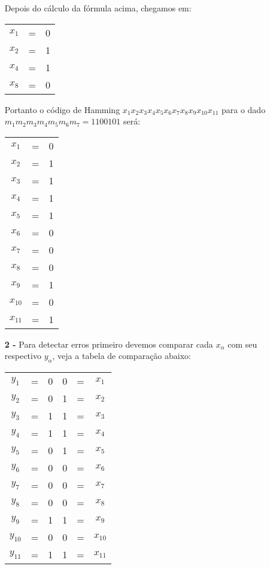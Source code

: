 \documentclass[12pt]{article}
\begin{document}
\begin{itemize}
			Depois do cálculo da fórmula acima, chegamos em:
			\begin{center}
				\begin{tabular}{ccl}
					$x_1$ & = & 0\\
					$x_2$ & = & 1\\
					$x_4$ & = & 1\\
					$x_8$ & = & 0\\
				\end{tabular}
			\end{center}
			Portanto o código de Hamming $x_1x_2x_3x_4x_5x_6x_7x_8x_9x_{10}x_{11}$ para 
			o dado $m_1m_2m_3m_4m_5m_6m_7 = 1100101$ será:
			\begin{center}
				\begin{tabular}{ccc}
					$x_1$ & = & 0\\
					$x_2$ & = & 1\\
					$x_3$ & = & 1 \\
					$x_4$ & = & 1\\
					$x_5$ & = & 1\\
					$x_6$ & = & 0\\
					$x_7$ & = & 0\\
					$x_8$ & = & 0\\
					$x_9$ & = & 1\\
					$x_{10}$ & = & 0\\
					$x_{11}$ & = & 1\\
				\end{tabular}
			\end{center}
		\newpage
		\item[\textbf{2 -}]
		\hfill\newline
			Para detectar erros primeiro devemos comparar cada $x_\alpha$ com seu respectivo $y_\alpha$,
			veja a tabela de comparação abaixo:
			\begin{center}
				\begin{tabular}{ccc|ccc}
					$y_1$ & = & 0 & 0 & = & $x_1$\\
					\color{red}$y_2$ & \color{red} = & \color{red}0 &
					\color{red}1 & \color{red} = & \color{red}$x_2$\\
					$y_3$ & = & 1 & 1 & = & $x_3$\\
					$y_4$ & = & 1 & 1 & = & $x_4$\\
					\color{red}$y_5$ & \color{red} = & \color{red} 0 &
					\color{red} 1 & \color{red} = & \color{red} $x_5$\\
					$y_6$ & = & 0 & 0 & = & $x_6$\\
					$y_7$ & = & 0 & 0 & = & $x_7$\\
					$y_8$ & = & 0 & 0 & = & $x_8$\\
					$y_9$ & = & 1 & 1 & = & $x_9$\\
					$y_{10}$ & = & 0 & 0 & = & $x_{10}$\\
					$y_{11}$ & = & 1 & 1 & = & $x_{11}$\\
				\end{tabular}
			\end{center}		
	\end{itemize}
\end{document}
